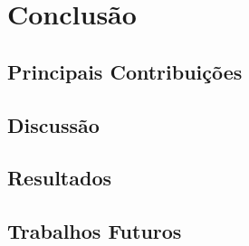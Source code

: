\chapter{Conclusão}

\section{Principais Contribuições}

\lipsum[1-4]

\section{Discussão}

\lipsum[2-4]

\section{Resultados}

\lipsum[2-4]

\section{Trabalhos Futuros}